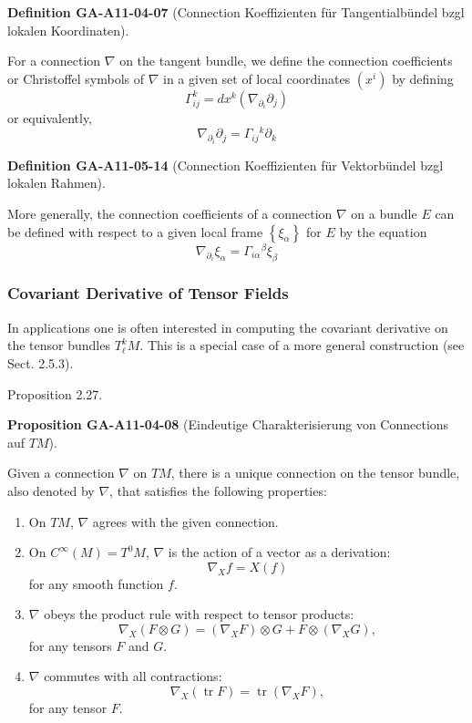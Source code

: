 \documentclass[10pt, letterpaper]{article}
\newcommand{\CustomHeading}[3]{%
  \par\medskip\noindent%
  \textbf{#1 #2} \textnormal{(#3)}.\enskip%
}
\newenvironment{DEF}[2]{\begin{unitbox}\CustomHeading{Definition}{#1}{#2}}{\end{unitbox}}
\newenvironment{PROP}[2]{\begin{unitbox}\CustomHeading{Proposition}{#1}{#2}}{\end{unitbox}}
\begin{document}
\begin{DEF}{GA-A11-04-07}{Connection Koeffizienten für Tangentialbündel bzgl lokalen Koordinaten}
For a connection $\nabla$ on the tangent bundle, we define the connection coefficients or Christoffel symbols of $\nabla$ in a given set of local coordinates $(x^{i})$ by defining
$$
\Gamma_{i j}^{k}=d x^{k}\left(\nabla_{\partial_{i}} \partial_{j}\right)
$$
or equivalently,
$$
\nabla_{\partial_{i}} \partial_{j}=\Gamma_{i j}{ }^{k} \partial_{k}
$$
\end{DEF}


\begin{DEF}{GA-A11-05-14}{Connection Koeffizienten für Vektorbündel bzgl lokalen Rahmen}
More generally, the connection coefficients of a connection $\nabla$ on a bundle $E$ can be defined with respect to a given local frame $\left\{\xi_{\alpha}\right\}$ for $E$ by the equation
$$
\nabla_{\partial_{i}} \xi_{\alpha}=\Gamma_{i \alpha}{ }^{\beta} \xi_{\beta}
$$
\end{DEF}



\subsubsection*{Covariant Derivative of Tensor Fields}
In applications one is often interested in computing the covariant derivative on the tensor bundles $T_{\ell}^{k} M$. This is a special case of a more general construction (see Sect. 2.5.3).

Proposition 2.27. 

\begin{PROP}{GA-A11-04-08}{Eindeutige Charakterisierung von Connections auf $TM$}
Given a connection $\nabla$ on $T M$, there is a unique connection on the tensor bundle, also denoted by $\nabla$, that satisfies the following properties:

\begin{enumerate}
  \item On $TM$, $\nabla$ agrees with the given connection.
  
  \item On $C^{\infty}(M) = T^0 M$, $\nabla$ is the action of a vector as a derivation:
  \[
  \nabla_X f = X(f)
  \]
  for any smooth function $f$.
  
  \item $\nabla$ obeys the product rule with respect to tensor products:
  \[
  \nabla_X(F \otimes G) = (\nabla_X F) \otimes G + F \otimes (\nabla_X G),
  \]
  for any tensors $F$ and $G$.
  
  \item $\nabla$ commutes with all contractions:
  \[
  \nabla_X(\operatorname{tr} F) = \operatorname{tr}(\nabla_X F),
  \]
  for any tensor $F$.
\end{enumerate}
\end{PROP}
\end{document}
